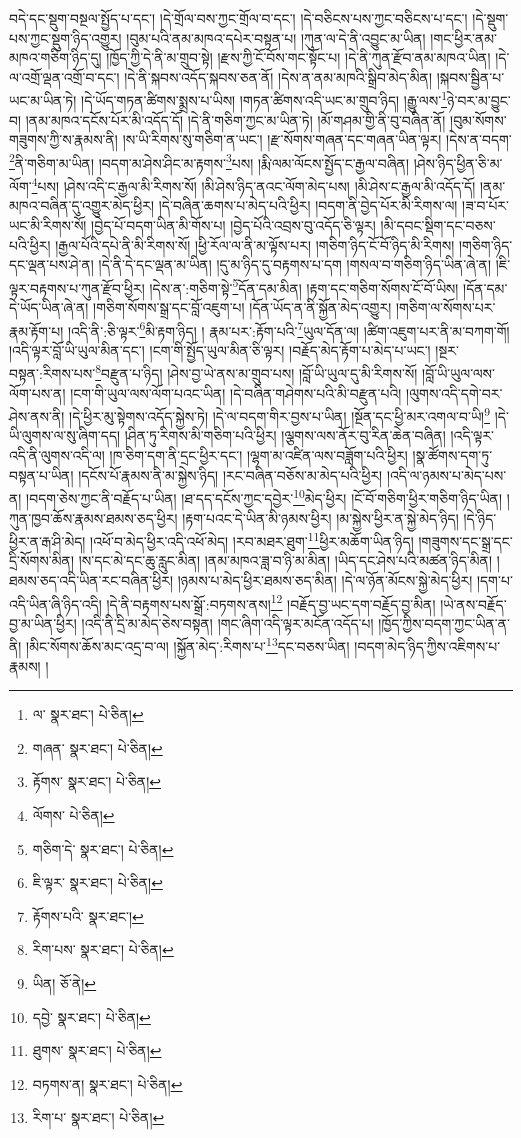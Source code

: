 བདེ་དང་སྡུག་བསྔལ་སྤྱོད་པ་དང་། །དེ་གྲོལ་བས་ཀྱང་གྲོལ་བ་དང་། །དེ་བཅིངས་པས་ཀྱང་བཅིངས་པ་དང་། །དེ་སྡུག་པས་ཀྱང་སྡུག་ཉིད་འགྱུར། །བུམ་པའི་ནམ་མཁའ་དཔེར་བསྟན་པ། །ཀུན་ལ་དེ་ནི་འབྱུང་མ་ཡིན། །གང་ཕྱིར་ནམ་མཁའ་གཅིག་ཉིད་དུ། །ཁྱོད་ཀྱི་དེ་ནི་མ་གྲུབ་སྟེ། །རྫས་ཀྱི་ངོ་བོས་གང་སྟོང་པ། །དེ་ནི་ཀུན་རྫོབ་ནམ་མཁའ་ཡིན། །དེ་ལ་འགྲོ་ལྡན་འགྲོ་བ་དང་། །དེ་ནི་སྐབས་འདོད་སྐབས་ཅན་ནོ། །དེས་ན་ནམ་མཁའི་སྒྲིབ་མེད་མིན། །སྐབས་སྦྱིན་པ་ཡང་མ་ཡིན་ཏེ། །དེ་ཡོད་གཏན་ཚིགས་སྨྲས་པ་ཡིས། །གཏན་ཚིགས་འདི་ཡང་མ་གྲུབ་ཉིད། །རྒྱུ་ལས་\footnote{ལ་  སྣར་ཐང་།  པེ་ཅིན། }ཉེ་བར་མ་བྱུང་བ། །ནམ་མཁའ་དངོས་པོར་མི་འདོད་དོ། །དེ་ནི་གཅིག་ཀྱང་མ་ཡིན་ཏེ། །མོ་གཤམ་གྱི་ནི་བུ་བཞིན་ནོ། །བུམ་སོགས་གཟུགས་ཀྱི་ས་རྣམས་ནི། །ས་ཡི་རིགས་སུ་གཅིག་ན་ཡང་། །རྫ་སོགས་གཞན་དང་གཞན་ཡིན་ལྟར། །དེས་ན་བདག་\footnote{གཞན་  སྣར་ཐང་།  པེ་ཅིན། }ནི་གཅིག་མ་ཡིན། །བདག་མ་ཤེས་ཤིང་མ་རྟགས་\footnote{རྟོགས་  སྣར་ཐང་།  པེ་ཅིན། }པས། །རྨི་ལམ་ལོངས་སྤྱོད་ང་རྒྱལ་བཞིན། །ཤེས་ཉིད་ཕྱིན་ཅི་མ་ལོག་\footnote{ལོགས་  པེ་ཅིན། }པས། །ཤེས་འདི་ང་རྒྱལ་མི་རིགས་སོ། །མི་ཤེས་ཉིད་ནའང་ལོག་མེད་པས། །མི་ཤེས་ང་རྒྱལ་མི་འདོད་དོ། །ནམ་མཁའ་བཞིན་དུ་འགྱུར་མེད་ཕྱིར། །དེ་བཞིན་ཆགས་པ་མེད་པའི་ཕྱིར། །བདག་ནི་བྱེད་པོར་མི་རིགས་ལ། །ཟ་བ་པོར་ཡང་མི་རིགས་སོ། །བྱེད་པོ་བདག་ཡིན་མི་གོས་པ། །བྱེད་པོའི་འབྲས་བུ་འདོད་ཅི་ལྟར། །མི་དབང་སྡིག་དང་བཅས་པའི་ཕྱིར། །རྒྱལ་པོའི་དཔེ་ནི་མི་རིགས་སོ། །ཕྱི་རོལ་ལ་ནི་མ་ལྟོས་པར། །གཅིག་ཉིད་ངོ་བོ་ཉིད་མི་རིགས། །གཅིག་ཉིད་དང་ལྡན་པས་ཤེ་ན། །དེ་ནི་དེ་དང་ལྡན་མ་ཡིན། །དུ་མ་ཉིད་དུ་བརྟགས་པ་དག །གསལ་བ་གཅིག་ཉིད་ཡིན་ཞེ་ན། །ཇི་ལྟར་བརྟགས་པ་ཀུན་རྫོབ་ཕྱིར། །དེས་ན་:གཅིག་སྟེ་\footnote{གཅིག་དེ་  སྣར་ཐང་།  པེ་ཅིན། }དོན་དམ་མིན། །རྟག་དང་གཅིག་སོགས་ངོ་བོ་ཡིས། །དོན་དམ་དེ་ཡོད་ཡིན་ཞེ་ན། །གཅིག་སོགས་སྒྲ་དང་བློ་འཇུག་པ། །དོན་ཡོད་ན་ནི་སྐྱོན་མེད་འགྱུར། །གཅིག་ལ་སོགས་པར་རྣམ་རྟོག་པ། །འདི་ནི་:ཅི་ལྟར་\footnote{ཇི་ལྟར་  སྣར་ཐང་།  པེ་ཅིན། }མི་རྟག་ཉིད། །
རྣམ་པར་:རྟོག་པའི་\footnote{རྟོགས་པའི་  སྣར་ཐང་། }ཡུལ་དོན་ལ། །ཚིག་འཇུག་པར་ནི་མ་བཀག་གོ། །འདི་ལྟར་བློ་ཡི་ཡུལ་མིན་དང་། །ངག་གི་སྤྱོད་ཡུལ་མིན་ཅི་ལྟར། །བརྗོད་མེད་རྟོག་པ་མེད་པ་ཡང་། །སྔར་བསྟན་:རིགས་པས་\footnote{རིག་པས་  སྣར་ཐང་།  པེ་ཅིན། }བརྫུན་པ་ཉིད། །ཤེས་བྱ་ཡེ་ནས་མ་གྲུབ་པས། །བློ་ཡི་ཡུལ་དུ་མི་རིགས་སོ། །བློ་ཡི་ཡུལ་ལས་ལོག་པས་ན། །ངག་གི་ཡུལ་ལས་ལོག་པའང་ཡིན། །དེ་བཞིན་གཤེགས་པའི་མི་བརྫུན་པའི། །ལུགས་འདི་དགེ་བར་ཤེས་ནས་ནི། །དེ་ཕྱིར་མུ་སྟེགས་འདོད་སྐྱེས་ཏེ། །དེ་ལ་བདག་གིར་བྱས་པ་ཡིན། །སྔོན་དང་ཕྱི་མར་འགལ་བ་ཡི།\footnote{ཡིན།  ཅོ་ནེ། } །དེ་ཡི་ལུགས་ལ་སུ་ཞིག་དད། །ཤིན་ཏུ་རིགས་མི་གཅིག་པའི་ཕྱིར། །ལྕགས་ལས་ནོར་བུ་རིན་ཆེན་བཞིན། །འདི་ལྟར་འདི་ནི་ལུགས་འདི་ལ། །ཁ་ཅིག་དག་ནི་དྲང་ཕྱིར་དང་། །ལྷག་མ་འཛིན་ལས་བཟློག་པའི་ཕྱིར། །སྣ་ཚོགས་དག་ཏུ་བསྟན་པ་ཡིན། །དངོས་པོ་རྣམས་ནི་མ་སྐྱེས་ཉིད། །རང་བཞིན་བཅོས་མ་མེད་པའི་ཕྱིར། །འདི་ལ་ཉམས་པ་མེད་པས་ན། །བདག་ཅེས་ཀྱང་ནི་བརྗོད་པ་ཡིན། །ཐ་དད་དངོས་ཀྱང་དབྱེར་\footnote{དབྱེ་  སྣར་ཐང་།  པེ་ཅིན། }མེད་ཕྱིར། །ངོ་བོ་གཅིག་ཕྱིར་གཅིག་ཉིད་ཡིན། །ཀུན་ཁྱབ་ཆོས་རྣམས་ཐམས་ཅད་ཕྱིར། །རྟག་པའང་དེ་ཡིན་མི་ཉམས་ཕྱིར། །མ་སྐྱེས་ཕྱིར་ན་སྐྱེ་མེད་ཉིད། །དེ་ཉིད་ཕྱིར་ན་རྒ་ཤི་མེད། །འཕོ་བ་མེད་ཕྱིར་འདི་འཕོ་མེད། །རབ་མཐར་ཐུག་\footnote{ཐུགས་  སྣར་ཐང་།  པེ་ཅིན། }ཕྱིར་མཆོག་ཡིན་ཉིད། །གཟུགས་དང་སྒྲ་དང་དྲི་སོགས་མིན། །ས་དང་མེ་དང་ཆུ་རླུང་མིན། །ནམ་མཁའ་ཟླ་བ་ཉི་མ་མིན། །ཡིད་དང་ཤེས་པའི་མཚན་ཉིད་མིན། །ཐམས་ཅད་འདི་ཡིན་རང་བཞིན་ཕྱིར། །ཉམས་པ་མེད་ཕྱིར་ཐམས་ཅད་མིན། །དེ་ལ་ཉོན་མོངས་སྐྱེ་མེད་ཕྱིར། །དག་པ་འདི་ཡིན་ཞི་ཉིད་འདི། །དེ་ནི་བརྟགས་པས་སྒྲོ་:བཏགས་ནས།\footnote{བཏགས་ན།  སྣར་ཐང་།  པེ་ཅིན། } །བརྗོད་བྱ་ཡང་དག་བརྗོད་བྱ་མིན། །ཡེ་ནས་བརྗོད་བྱ་མ་ཡིན་ཕྱིར། །འདི་ནི་དྲི་མ་མེད་ཅེས་བསྟན། །གང་ཞིག་འདི་ལྟར་མངོན་འདོད་པ། །ཁྱོད་ཀྱིས་བདག་ཀྱང་ཡིན་ན་ནི། །མིང་སོགས་ཆོས་མང་འདྲ་བ་ལ། །སྐྱོན་མེད་:རིགས་པ་\footnote{རིག་པ་  སྣར་ཐང་།  པེ་ཅིན། }དང་བཅས་ཡིན། །བདག་མེད་ཉིད་ཀྱིས་འཇིགས་པ་རྣམས། །
